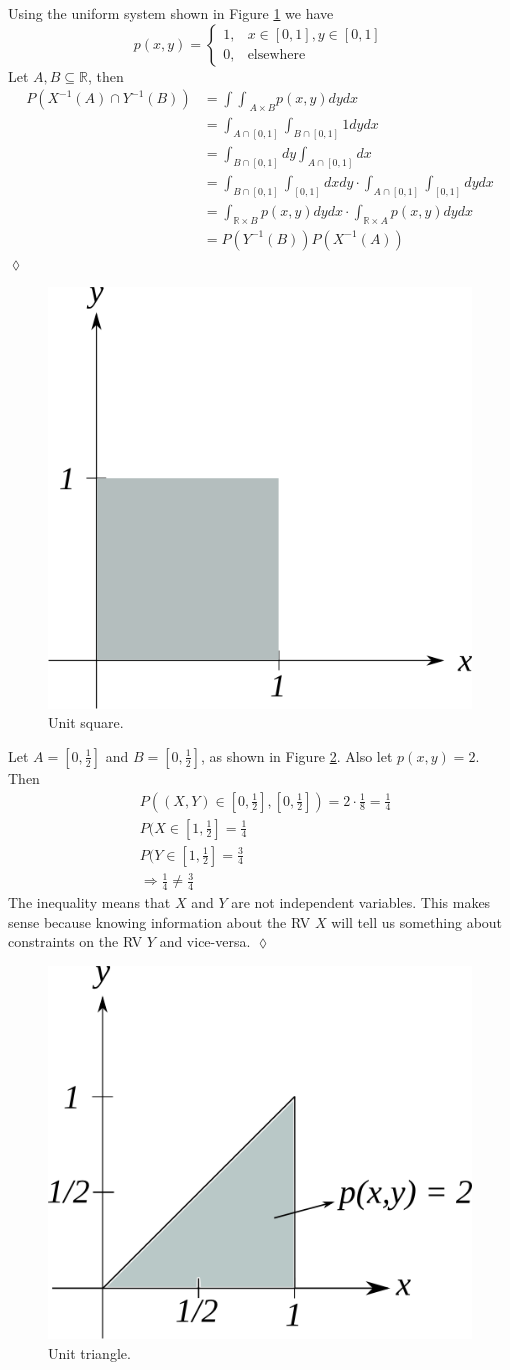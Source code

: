 \documentclass[lecture,12pt,]{pcms-l}
\begin{document}
\begin{example}
Using the uniform system shown in Figure \ref{fig:02unitSquare} we have
$$p(x,y) = \begin{cases} 1, & x\in[0,1],y\in[0,1] \\ 0, & \text{elsewhere} \end{cases}$$
Let $A,B\subseteq\mathbb{R}$, then
\begin{align*}
P(X^{-1}(A) \cap Y^{-1}(B)) &= {\int\int}_{A\times B} p(x,y)dydx \\
&= \int_{A\cap[0,1]}\int_{B\cap[0,1]} 1 dydx \\
&= \int_{B\cap[0,1]}dy \int_{A\cap[0,1]}dx \\
&= \int_{B\cap[0,1]}\int_{[0,1]}dxdy \cdot \int_{A\cap[0,1]}\int_{[0,1]}dydx \\
&= \int_{\mathbb{R}\times B}p(x,y)dydx \cdot \int_{\mathbb{R}\times A}p(x,y)dydx \\
&= P(Y^{-1}(B)) P(X^{-1}(A))
\end{align*}
$\lozenge$
\end{example}
\begin{figure}[ht!]
	\centering
	\includegraphics[width=.3\textwidth]{images/02unitSquare}
	\caption{Unit square.}
	\label{fig:02unitSquare}
\end{figure}

\begin{example}
Let $A=[0,\frac{1}{2}]$ and $B=[0,\frac{1}{2}]$, as shown in Figure \ref{fig:02unitTriangle}. Also let $p(x,y)=2$. Then
\begin{align*}
&P((X,Y)\in [0,\frac{1}{2}],[0,\frac{1}{2}]) = 2\cdot \frac{1}{8} = \frac{1}{4} \\
&P(X\in[1,\frac{1}{2}] = \frac{1}{4} \\
&P(Y\in[1,\frac{1}{2}] = \frac{3}{4} \\
&\Rightarrow \frac{1}{4} \neq \frac{3}{4}
\end{align*}
The inequality means that $X$ and $Y$ are not independent variables. This makes sense because knowing information about the RV $X$ will tell us something about constraints on the RV $Y$ and vice-versa.
$\lozenge$
\end{example}
\begin{figure}[ht!]
	\centering
	\includegraphics[width=.3\textwidth]{images/02unitTriangle}
	\caption{Unit triangle.}
	\label{fig:02unitTriangle}
\end{figure}
\end{document}
